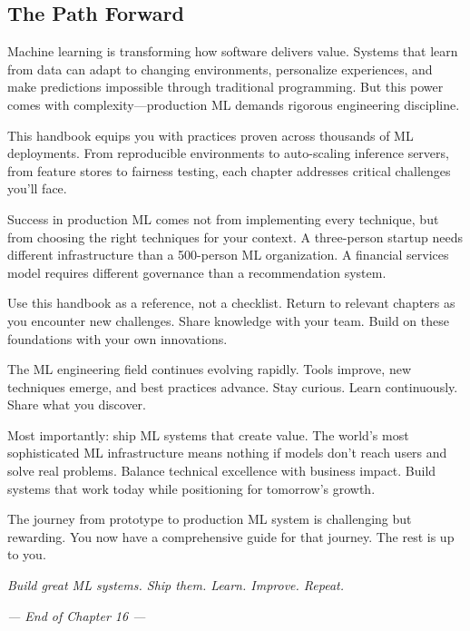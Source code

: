 \subsection{The Path Forward}

Machine learning is transforming how software delivers value. Systems that learn from data can adapt to changing environments, personalize experiences, and make predictions impossible through traditional programming. But this power comes with complexity---production ML demands rigorous engineering discipline.

This handbook equips you with practices proven across thousands of ML deployments. From reproducible environments to auto-scaling inference servers, from feature stores to fairness testing, each chapter addresses critical challenges you'll face.

Success in production ML comes not from implementing every technique, but from choosing the right techniques for your context. A three-person startup needs different infrastructure than a 500-person ML organization. A financial services model requires different governance than a recommendation system.

Use this handbook as a reference, not a checklist. Return to relevant chapters as you encounter new challenges. Share knowledge with your team. Build on these foundations with your own innovations.

The ML engineering field continues evolving rapidly. Tools improve, new techniques emerge, and best practices advance. Stay curious. Learn continuously. Share what you discover.

Most importantly: ship ML systems that create value. The world's most sophisticated ML infrastructure means nothing if models don't reach users and solve real problems. Balance technical excellence with business impact. Build systems that work today while positioning for tomorrow's growth.

The journey from prototype to production ML system is challenging but rewarding. You now have a comprehensive guide for that journey. The rest is up to you.

\textit{Build great ML systems. Ship them. Learn. Improve. Repeat.}

\vspace{1cm}

\begin{center}
\textit{--- End of Chapter 16 ---}
\end{center}


